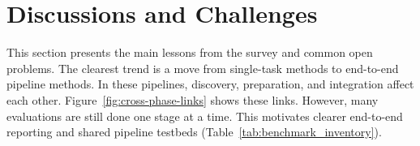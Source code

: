 \documentclass[sigconf,nonacm]{acmart}
\begin{document}
\section{Discussions and Challenges}
\label{sec:discussion-challenges}

This section presents the main lessons from the survey and common open problems.
The clearest trend is a move from single-task methods to end-to-end pipeline methods.
In these pipelines, discovery, preparation, and integration affect each other.
Figure~\ref{fig:cross-phase-links} shows these links.
However, many evaluations are still done one stage at a time.
This motivates clearer end-to-end reporting and shared pipeline testbeds (Table~\ref{tab:benchmark_inventory}).
\end{document}
